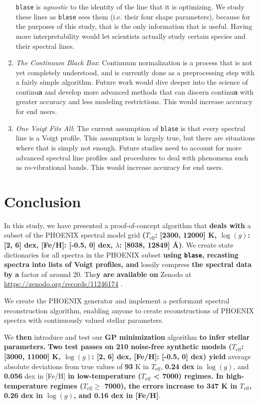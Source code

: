 \documentclass[twocolumn, linenumbers]{aastex631}
\begin{document}
\begin{enumerate}[label=-]
    \texttt{blase} is \textit{agnostic} to the identity of the line that it is optimizing.
    We study these lines as \texttt{blase} sees them (i.e. their four shape parameters), because for the purposes of this study, that is the only information that is useful.
    Having more interpretability would let scientists actually study certain species and their spectral lines.
    \item \textit{The Continuum Black Box}: Continuum normalization is a process that is not yet completely understood, and is currently done as a preprocessing step with a fairly simple algorithm.
    Future work would dive deeper into the science of continu\textbf{a} and develop more advanced methods that can discern continu\textbf{a} with greater accuracy and less modeling restrictions.
    This would increase accuracy for end users.
    \item \textit{One Voigt Fits All}: The current assumption of \texttt{blase} is that every spectral line is a Voigt profile.
    This assumption is largely true, but there are situations where that is simply not enough.
    Future studies need to account for more advanced spectral line profiles and procedures to deal with phenomena such as ro-vibrational bands.
    This would increase accuracy for end users.
\end{enumerate}

\section{Conclusion}
In this study, we have presented a proof-of-concept algorithm that \textbf{deals with} a subset of the PHOENIX spectral model grid \textbf{($T_\text{eff}$: [2300, 12000] K, $\log(g)$: [2, 6] dex, [Fe/H]: [-0.5, 0] dex, $\lambda$: [8038, 12849] \AA)}.
We create state dictionaries for all spectra in the PHOENIX subset \textbf{using \texttt{blase}, recasting spectra into lists of Voigt profiles, and} lossily compress \textbf{the spectral data by a} factor of around 20. 
The\textbf{y are available on} Zenodo at \url{https://zenodo.org/records/11246174} \citep{zenodo}.

We create the PHOENIX generator and implement a performant spectral reconstruction algorithm, enabling anyone to create reconstructions of PHOENIX spectra with continuously valued stellar parameters.

We \textbf{then} introduce and test our \textbf{GP minimization} algorithm \textbf{to infer stellar parameters.} 
\textbf{Two test passes on 210 noise-free synthetic models ($T_{\mathrm{eff}}$: [3000, 11000] K, $\log(g)$: [2, 6] dex, [Fe/H]: [-0.5, 0] dex) yield} average absolute deviations from true values of \textbf{93} K in $T_\mathrm{eff}$, \textbf{0.24 dex} in $\log(g)$, and \textbf{0.056} dex in [Fe/H] \textbf{in low-temperature ($T_\mathrm{eff}$ < 7000) regimes.
In high-temperature regimes ($T_\text{eff} \ge$ 7000), the errors increase to 347 K in $T_\mathrm{eff}$, 0.26 dex in $\log(g)$, and 0.16 dex in [Fe/H]}.
\end{document}
